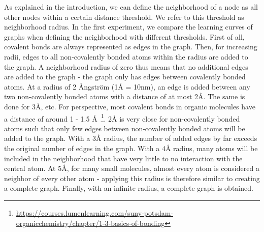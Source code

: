 As explained in the introduction, we can define the neighborhood of a node as all other nodes within a certain distance threshold. We refer to this threshold as neighborhood radius. In the first experiment, we compare the learning curves of graphs when defining the neighborhood with different thresholds. First of all, covalent bonds are always represented as edges in the graph. Then, for increasing radii, edges to all non-covalently bonded atoms within the radius are added to the graph. A neighborhood radius of zero thus means that no additional edges are added to the graph - the graph only has edges between covalently bonded atoms. At a radius of 2 Ångström (1Å = 10nm), an edge is added between any two non-covalently bonded atoms with a distance of at most 2Å. The same is done for 3Å, etc. For perspective, most covalent bonds in organic molecules have a distance of around 1 - 1.5 Å~\footnote{\url{https://courses.lumenlearning.com/suny-potsdam-organicchemistry/chapter/1-3-basics-of-bonding}}. 2Å is very close for non-covalently bonded atoms such that only few edges between non-covalently bonded atoms will be added to the graph. With a 3Å radius, the number of added edges by far exceeds the original number of edges in the graph. With a 4Å radius, many atoms will be included in the neighborhood that have very little to no interaction with the central atom. At 5Å, for many small molecules, almost every atom is considered a neighbor of every other atom - applying this radius is therefore similar to creating a complete graph. Finally, with an infinite radius, a complete graph is obtained.

